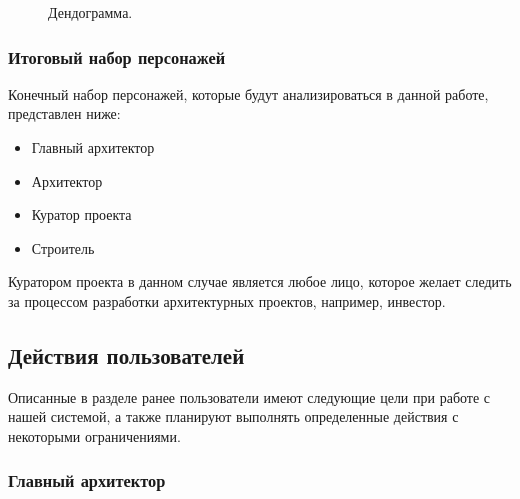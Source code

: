 \documentclass[a4paper,14pt]{extreport} %
\begin{document}
\begin{figure}[H]
\caption{Дендограмма.}
\label{dendogramm}
\end{figure}

\subsubsection{Итоговый набор персонажей}

Конечный набор персонажей, которые будут анализироваться в данной работе, представлен ниже:
\begin{itemize}
\item Главный архитектор
\item Архитектор
\item Куратор проекта
\item Строитель
\end{itemize}

Куратором проекта в данном случае является любое лицо, которое желает следить за процессом разработки архитектурных проектов, например, инвестор.

\newpage
\subsection{Действия пользователей}

Описанные в разделе ранее пользователи имеют следующие цели при работе с нашей системой, а также планируют выполнять определенные действия с некоторыми ограничениями.

\subsubsection{Главный архитектор}
\end{document}
